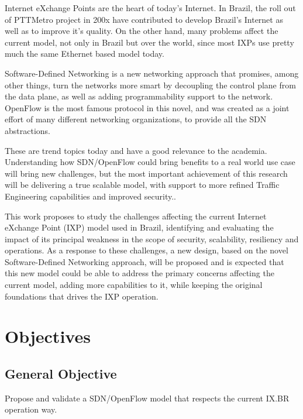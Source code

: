 Internet eXchange Points are the heart of today's Internet. In Brazil, the roll out of PTTMetro project in 200x have contributed to develop Brazil's Internet as well as to improve it's quality. On the other hand, many problems affect the current model, not only in Brazil but over the world, since most IXPs use pretty much the same Ethernet based model today.

Software-Defined Networking is a new networking approach that promises, among other things, turn the networks more smart by decoupling the control plane from the data plane, as well as adding programmability support to the network. OpenFlow is the most famous protocol in this novel, and was created as a joint effort of many different networking organizations, to provide all the SDN abstractions.

These are trend topics today and have a good relevance to the academia. Understanding how SDN/OpenFlow could bring benefits to a real world use case will bring new challenges, but the most important achievement of this research will be delivering a true scalable model, with support to more refined Traffic Engineering capabilities and improved security..

This work proposes to study the challenges affecting the current Internet eXchange Point (IXP) model used in Brazil, identifying and evaluating the impact of its principal weakness in the scope of security, scalability, resiliency and operations. As a response to these challenges, a new design, based on the novel Software-Defined Networking approach, will be proposed and is expected that this new model could be able to address the primary concerns affecting the current model, adding more capabilities to it, while keeping the original foundations that drives the IXP operation.


\section{Objectives}
\label{s_objetivos}
\subsection{General Objective}
Propose and validate a SDN/OpenFlow model that respects the current IX.BR operation way.

